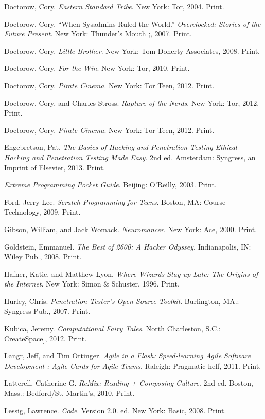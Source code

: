 \documentclass[letterpaper,10pt,english]{sphinxmanual}
\begin{document}
Doctorow, Cory. \emph{Eastern Standard Tribe}. New York: Tor, 2004. Print.

Doctorow, Cory. ``When Sysadmins Ruled the World.'' \emph{Overclocked: Stories of the Future Present}. New York: Thunder's Mouth ;, 2007. Print.

Doctorow, Cory. \emph{Little Brother}. New York: Tom Doherty Associates, 2008.
Print.

Doctorow, Cory. \emph{For the Win}. New York: Tor, 2010. Print.

Doctorow, Cory. \emph{Pirate Cinema}. New York: Tor Teen, 2012. Print.

Doctorow, Cory, and Charles Stross. \emph{Rapture of the Nerds}. New York: Tor,
2012. Print.

Doctorow, Cory. \emph{Pirate Cinema}. New York: Tor Teen, 2012. Print.

Engebretson, Pat. \emph{The Basics of Hacking and Penetration Testing Ethical Hacking and Penetration Testing Made Easy}. 2nd ed. Amsterdam: Syngress,
an Imprint of Elsevier, 2013. Print.

\emph{Extreme Programming Pocket Guide}. Beijing: O'Reilly, 2003. Print.

Ford, Jerry Lee. \emph{Scratch Programming for Teens}. Boston, MA: Course
Technology, 2009. Print.

Gibson, William, and Jack Womack. \emph{Neuromancer}. New York: Ace, 2000.
Print.

Goldstein, Emmanuel. \emph{The Best of 2600: A Hacker Odyssey}. Indianapolis,
IN: Wiley Pub., 2008. Print.

Hafner, Katie, and Matthew Lyon. \emph{Where Wizards Stay up Late: The Origins
of the Internet}. New York: Simon \& Schuster, 1996. Print.

Hurley, Chris. \emph{Penetration Tester's Open Source Toolkit}. Burlington,
MA.: Syngress Pub., 2007. Print.

Kubica, Jeremy. \emph{Computational Fairy Tales}. North Charleston, S.C.:
CreateSpace{]}, 2012. Print.

Langr, Jeff, and Tim Ottinger. \emph{Agile in a Flash: Speed-learning Agile
Software Development : Agile Cards for Agile Teams}. Raleigh: Pragmatic
helf, 2011. Print.

Latterell, Catherine G. \emph{ReMix: Reading + Composing Culture}. 2nd ed. Boston, Mass.: Bedford/St. Martin's, 2010. Print.

Lessig, Lawrence. \emph{Code}. Version 2.0. ed. New York: Basic, 2008. Print.
\end{document}
